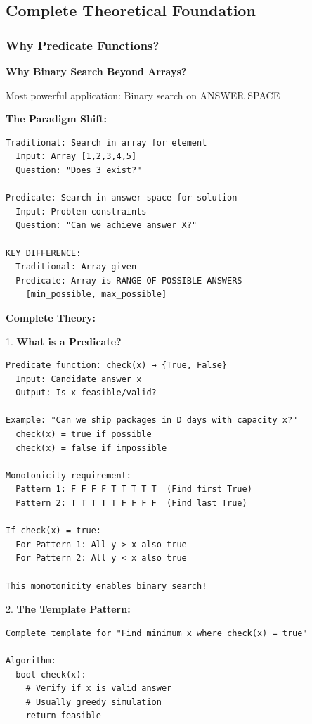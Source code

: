 \documentclass[11pt,a4paper,oneside]{book}
\begin{document}
\subsection{Complete Theoretical Foundation}

\subsubsection{Why Predicate Functions?}

\begin{tcolorbox}[
    enhanced,breakable,
    colback=white,
    colframe=deepblue,
    boxrule=1.5pt,
    arc=3mm,
    title=\textbf{The Search Space Transformation}
]
\textbf{Why Binary Search Beyond Arrays?}

Most powerful application: Binary search on ANSWER SPACE

\textbf{The Paradigm Shift:}
\begin{verbatim}
Traditional: Search in array for element
  Input: Array [1,2,3,4,5]
  Question: "Does 3 exist?"
  
Predicate: Search in answer space for solution
  Input: Problem constraints
  Question: "Can we achieve answer X?"
  
KEY DIFFERENCE:
  Traditional: Array given
  Predicate: Array is RANGE OF POSSIBLE ANSWERS
    [min_possible, max_possible]
\end{verbatim}

\textbf{Complete Theory:}

1. \textbf{What is a Predicate?}
\begin{verbatim}
Predicate function: check(x) → {True, False}
  Input: Candidate answer x
  Output: Is x feasible/valid?

Example: "Can we ship packages in D days with capacity x?"
  check(x) = true if possible
  check(x) = false if impossible

Monotonicity requirement:
  Pattern 1: F F F F T T T T T  (Find first True)
  Pattern 2: T T T T T F F F F  (Find last True)

If check(x) = true:
  For Pattern 1: All y > x also true
  For Pattern 2: All y < x also true

This monotonicity enables binary search!
\end{verbatim}

2. \textbf{The Template Pattern:}
\begin{verbatim}
Complete template for "Find minimum x where check(x) = true"

Algorithm:
  bool check(x):
    # Verify if x is valid answer
    # Usually greedy simulation
    return feasible
  

\end{verbatim}
\end{tcolorbox}
\end{document}
